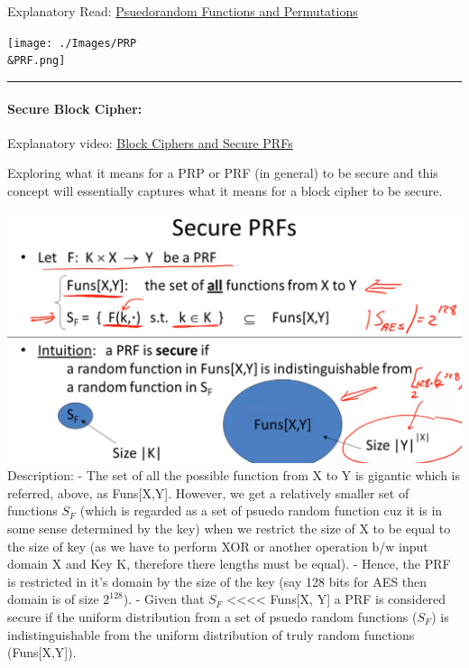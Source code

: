 \documentclass[11pt]{article}
\makeatletter
\def\maxwidth{\ifdim\Gin@nat@width>\linewidth\linewidth
    \else\Gin@nat@width\fi}
\let\Oldincludegraphics\includegraphics
\renewcommand{\includegraphics}[1]{\Oldincludegraphics[width=.8\maxwidth]{#1}}
\makeatother
\begin{document}
Explanatory Read:
\href{http://www.crypto-it.net/eng/theory/prf-and-prp.html}{Psuedorandom
Functions and Permutations}

\texttt{[image: ./Images/PRP\\\&PRF.png]}

\begin{center}\rule{0.5\linewidth}{\linethickness}\end{center}

    \hypertarget{secure-block-cipher}{%
\paragraph{Secure Block Cipher:}\label{secure-block-cipher}}

Explanatory video:
\href{https://www.coursera.org/learn/crypto/lecture/t4JJr/what-are-block-ciphers}{Block
Ciphers and Secure PRFs}

Exploring what it means for a PRP or PRF (in general) to be secure and
this concept will essentially captures what it means for a block cipher
to be secure.

\includegraphics{./Images/SecurePRF.png} Description: - The set of all
the possible function from X to Y is gigantic which is referred, above,
as Funs{[}X,Y{]}. However, we get a relatively smaller set of functions
\(S_{F}\) (which is regarded as a set of psuedo random function cuz it
is in some sense determined by the key) when we restrict the size of X
to be equal to the size of key (as we have to perform XOR or another
operation b/w input domain X and Key K, therefore there lengths must be
equal). - Hence, the PRF is restricted in it's domain by the size of the
key (say 128 bits for AES then domain is of size \(2^{128}\)). - Given
that \(S_{F}\) \textless{}\textless{}\textless{}\textless{} Funs{[}X,
Y{]} a PRF is considered secure if the uniform distribution from a set
of psuedo random functions (\(S_{F}\)) is indistinguishable from the
uniform distribution of truly random functions (Funs{[}X,Y{]}).
\end{document}
